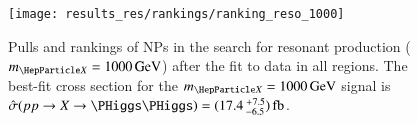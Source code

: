 \begin{figure}[htbp]
  \centering

  \texttt{[image: results\_res/rankings/ranking\_reso\_1000]}

  \caption{Pulls and rankings of NPs in the search for resonant \HH production
    ($\mX = \SI{1000}{\GeV}$) after the fit to data in all regions. The best-fit
    cross section for the $\mX = \SI{1000}{\GeV}$ signal is
    $\hat{\sigma}(\pp \to X \to \HH) =
    (\num{17.4}\valuesep^{\hspace{0.25pt}+\hspace{0.25pt}7.5}_{-6.5})\valuesep\si{\femto\barn}$.}%
  \label{fig:ranking_pulls_mx1000}
\end{figure}


